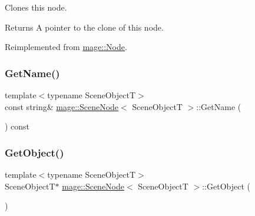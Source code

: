 Clones this node.

\begin{DoxyReturn}{Returns}
A pointer to the clone of this node. 
\end{DoxyReturn}


Reimplemented from \hyperlink{classmage_1_1_node_ac2ff348254ff10db82fca1d2d9ffeeb9}{mage\+::\+Node}.

\hypertarget{classmage_1_1_scene_node_ab8245744de5c344b52fec0b2679caeb0}{}\label{classmage_1_1_scene_node_ab8245744de5c344b52fec0b2679caeb0} 
\subsubsection{\texorpdfstring{Get\+Name()}{GetName()}}
{\footnotesize\ttfamily template$<$typename Scene\+ObjectT$>$ \\
const string\& \hyperlink{classmage_1_1_scene_node}{mage\+::\+Scene\+Node}$<$ Scene\+ObjectT $>$\+::Get\+Name (\begin{DoxyParamCaption}{ }\end{DoxyParamCaption}) const}

\hypertarget{classmage_1_1_scene_node_a1c5f19002fe2b056673eb3c9dedf1bf1}{}\label{classmage_1_1_scene_node_a1c5f19002fe2b056673eb3c9dedf1bf1} 
\subsubsection{\texorpdfstring{Get\+Object()}{GetObject()}\hspace{0.1cm}{\footnotesize\ttfamily [1/2]}}
{\footnotesize\ttfamily template$<$typename Scene\+ObjectT$>$ \\
Scene\+ObjectT$\ast$ \hyperlink{classmage_1_1_scene_node}{mage\+::\+Scene\+Node}$<$ Scene\+ObjectT $>$\+::Get\+Object (\begin{DoxyParamCaption}{ }\end{DoxyParamCaption})}

\hypertarget{classmage_1_1_scene_node_a9efded16dbe61f16e498246ea3ba9095}{}\label{classmage_1_1_scene_node_a9efded16dbe61f16e498246ea3ba9095} 
